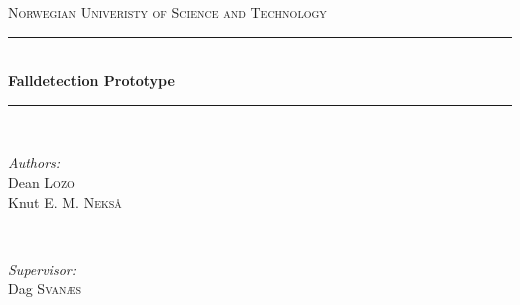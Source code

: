 \documentclass[11pt,twoside,a4paper]{report}
\begin{document}
\begin{titlepage}

\newcommand{\HRule}{\rule{\linewidth}{0.5mm}} %

\center %
 

\textsc{\LARGE Norwegian Univeristy of Science and Technology}\\[1.5cm] %


\HRule \\[0.4cm]
{ \huge \bfseries Falldetection Prototype}\\[0.4cm] %
\HRule \\[1.5cm]
 

\begin{minipage}{0.4\textwidth}
\begin{flushleft} \large
\emph{Authors:}\\
Dean \textsc{Lozo}\\ %
Knut \textsc{E. M. Nekså}\\ %
\end{flushleft}
\end{minipage}
~
\begin{minipage}{0.4\textwidth}
\begin{flushright} \large
\emph{Supervisor:} \\
Dag \textsc{Svanæs} %
\end{flushright}
\end{minipage}\\[3cm]


\end{titlepage}
\end{document}
